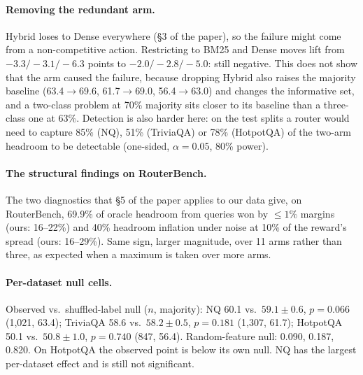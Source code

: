 \documentclass{article}
\begin{document}
\paragraph{Removing the redundant arm.} Hybrid loses to Dense everywhere (\S3 of the paper), so the
failure might come from a non-competitive action. Restricting to
BM25 and Dense moves lift from $-3.3/-3.1/-6.3$ points to $-2.0/-2.8/-5.0$: still negative. This does not show that the arm caused the failure, because dropping Hybrid also
raises the majority baseline (63.4$\to$69.6, 61.7$\to$69.0, 56.4$\to$63.0) and changes the informative set,
and a two-class problem at 70\% majority sits closer to its baseline than a three-class one at
63\%. Detection is also harder here: on the test splits a router would need to capture 85\% (NQ), 51\%
(TriviaQA) or 78\% (HotpotQA) of the two-arm headroom to be detectable (one-sided, $\alpha{=}0.05$,
80\% power).


\paragraph{The structural findings on RouterBench.} The two diagnostics that \S5 of the paper
applies to our data give, on RouterBench, 69.9\% of oracle headroom from queries won by
$\le 1\%$ margins (ours: 16--22\%) and 40\% headroom inflation under noise at 10\% of the reward's
spread (ours: 16--29\%). Same sign, larger magnitude, over 11 arms rather than three, as expected when a maximum is taken
over more arms.

\paragraph{Per-dataset null cells.} Observed vs.\ shuffled-label null ($n$, majority): NQ 60.1
vs.\ $59.1{\pm}0.6$, $p{=}0.066$ (1{,}021, 63.4); TriviaQA 58.6 vs.\ $58.2{\pm}0.5$, $p{=}0.181$
(1{,}307, 61.7); HotpotQA 50.1 vs.\ $50.8{\pm}1.0$, $p{=}0.740$ (847, 56.4). Random-feature null:
0.090, 0.187, 0.820. On HotpotQA the observed point is below its own null. NQ has the largest per-dataset effect and is
still not significant.
\end{document}
